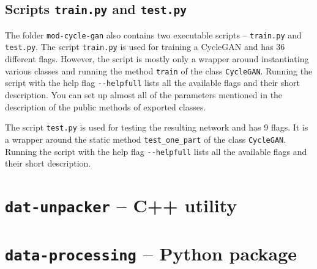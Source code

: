 \subsection{Scripts \texttt{train.py} and \texttt{test.py}} \label{trainpy}

The folder \texttt{mod-cycle-gan} also contains two executable scripts -- \texttt{train.py} and \texttt{test.py}. The script \texttt{train.py} is used for training a CycleGAN and has 36 different flags. However, the script is mostly only a wrapper around instantiating various classes and running the method \texttt{train} of the class \texttt{CycleGAN}. Running the script with the help flag \texttt{-{}-helpfull} lists all the available flags and their short description. You can set up almost all of the parameters mentioned in the description of the public methods of exported classes.

The script \texttt{test.py} is used for testing the resulting network and has 9 flags. It is a wrapper around the static method \texttt{test\_one\_part} of the class \texttt{CycleGAN}. Running the script with the help flag \texttt{-{}-helpfull} lists all the available flags and their short description.

\section[\texttt{dat-unpacker}]{\texttt{dat-unpacker} -- C++ utility}

\section[\texttt{data-processing}]{\texttt{data-processing} -- Python package}
